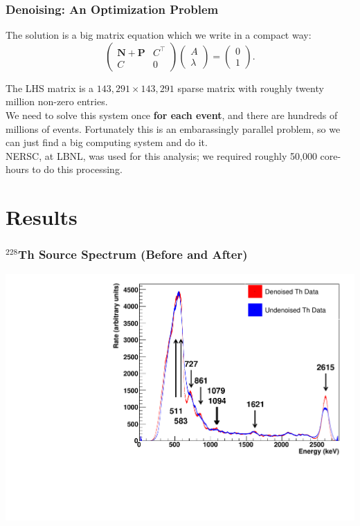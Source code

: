 \documentclass{beamer}
\begin{document}
\begin{frame}
\begin{center}
\frametitle{Denoising: An Optimization Problem}
\end{center}
The solution is a big matrix equation which we write in a compact way:
\[\begin{pmatrix}\mathbf{N+P}&C^{\top}\\C & 0\end{pmatrix}\begin{pmatrix}A\\\lambda\end{pmatrix} = \begin{pmatrix}0\\1\end{pmatrix}.\]

The LHS matrix is a $143,\!291 \times 143,\!291$ sparse matrix with roughly twenty million non-zero entries.\\[\baselineskip]

We need to solve this system once {\bf for each event}, and there are hundreds of millions of events.  Fortunately this is an embarassingly parallel problem, so we can just find a big computing system and do it.\\[\baselineskip]

NERSC, at LBNL, was used for this analysis; we required roughly 50,000 core-hours to do this processing.
\end{frame}

\section{Results}

\begin{frame}
\begin{center}
\frametitle{$^{228}$Th Source Spectrum (Before and After)}
\end{center}
\vspace{1cm}
\begin{center}
\includegraphics[keepaspectratio=true,width=\textwidth]{ThSourceSpectrumComparison.pdf}
\end{center}
\end{frame}
\end{document}
